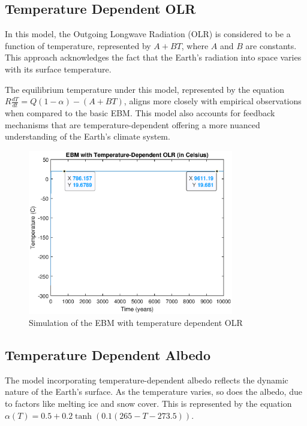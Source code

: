 \documentclass[12pt]{article}
\begin{document}
\subsection{Temperature Dependent OLR}
In this model, the Outgoing Longwave Radiation (OLR) is considered to be a function of temperature, represented by \( A + BT \), where \( A \) and \( B \) are constants. This approach acknowledges the fact that the Earth's radiation into space varies with its surface temperature\cite{kaper-2013-math-ac-budyko}.

The equilibrium temperature under this model, represented by the equation \( R\frac{dT}{dt} = Q(1 - \alpha) - (A + BT) \), aligns more closely with empirical observations when compared to the basic EBM. This model also accounts for feedback mechanisms that are temperature-dependent offering a more nuanced understanding of the Earth's climate system.

\begin{figure}[H]
    \centering
    \includegraphics[width=0.8\textwidth]{images/temperature_dependent_olr.eps}
    \caption{Simulation of the EBM with temperature dependent OLR}
    \label{fig:ebm_temperature_olr}
\end{figure}

\subsection{Temperature Dependent Albedo}
The model incorporating temperature-dependent albedo
reflects the dynamic nature of the Earth's surface.
As the temperature varies, so does the albedo,
due to factors like melting ice and snow cover.
This is represented by the equation
\( \alpha(T) = 0.5 + 0.2 \tanh(0.1(265 - T - 273.5)) \).
\end{document}
